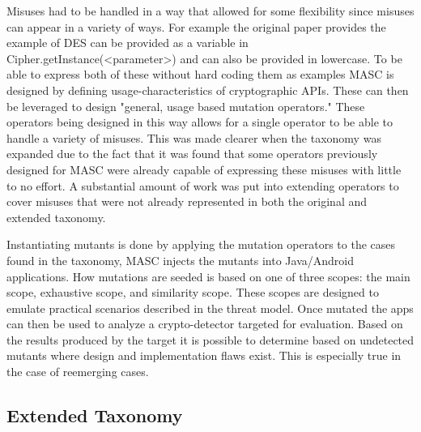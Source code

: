 Misuses had to be handled in a way that allowed for some flexibility since misuses can appear in a variety of ways. For example the original paper provides the example of DES can be provided as a variable in Cipher.getInstance(<parameter>) and can also be provided in lowercase. To be able to express both of these without hard coding them as examples MASC is designed by defining usage-characteristics of cryptographic APIs. These can then be leveraged to design "general, usage based mutation operators." These operators being designed in this way allows for a single operator to be able to handle a variety of misuses. This was made clearer when the taxonomy was expanded due to the fact that it was found that some operators previously designed for MASC were already capable of expressing these misuses with little to no effort. A substantial amount of work was put into extending operators to cover misuses that were not already represented in both the original and extended taxonomy.

Instantiating mutants is done by applying the mutation operators to the cases found in the taxonomy, MASC injects the mutants into Java/Android applications. How mutations are seeded is based on one of three scopes: the main scope, exhaustive scope, and similarity scope. These scopes are designed to emulate practical scenarios described in the threat model. Once mutated the apps can then be used to analyze a crypto-detector targeted for evaluation. Based on the results produced by the target it is possible to determine based on undetected mutants where design and implementation flaws exist. This is especially true in the case of reemerging cases.

\subsection{Extended Taxonomy}
\label{ch2:sec:taxonomy}

